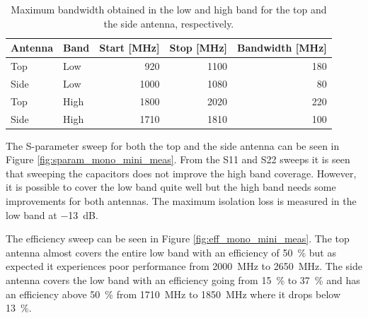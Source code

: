 \begin{table}
  \centering
  \begin{tabular}{|l|l|r|r|r|}
    \hline
    Antenna & Band & Start [MHz] & Stop [MHz] & Bandwidth [MHz] \\
    \hline
    Top     & Low  & 920         & 1100       & 180 \\
    Side    & Low  & 1000        & 1080        & 80 \\
    \hline
    Top     & High & 1800        & 2020       & 220 \\
    Side    & High & 1710        & 1810       & 100 \\
    \hline
  \end{tabular}
  \caption{Maximum bandwidth obtained in the low and high band for the top and the side antenna, respectively.}
  \label{tab:bw_mono_mini_meas}
\end{table}

The S-parameter sweep for both the top and the side antenna can be seen in Figure \ref{fig:sparam_mono_mini_meas}. From the S11 and S22 sweeps it is seen that sweeping the capacitors does not improve the high band coverage. However, it is possible to cover the low band quite well but the high band needs some improvements for both antennas.  
The maximum isolation loss is measured in the low band at \SI{-13}{dB}. 

The efficiency sweep can be seen in Figure \ref{fig:eff_mono_mini_meas}. The top antenna almost covers the entire low band with an efficiency of \SI{50}{\percent} but as expected it experiences poor performance from \SI{2000}{MHz} to \SI{2650}{MHz}. The side antenna covers the low band with an efficiency going from \SI{15}{\percent} to \SI{37}{\percent} and has an efficiency above \SI{50}{\percent} from \SI{1710}{MHz} to \SI{1850}{MHz} where it drops below \SI{13}{\percent}.

